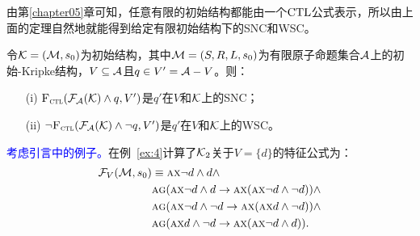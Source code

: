 由第\ref{chapter05}章可知，任意有限的初始结构都能由一个$\textrm{CTL}$公式表示，所以由上面的定理自然地就能得到给定有限初始结构下的SNC和WSC。
\begin{corollary}\label{thm:inK:SNC}
	令${\cal K}= ({\cal M}, s_0)$为初始结构，其中${\cal M}=(S,R,L,s_0)$为有限原子命题集合${\cal A}$上的初始-Kripke结构，$V \subseteq {\cal A}$且$q\in V' = {\cal A} - V$。则：
	\begin{itemize}
		\item[(i)] ${\textsc{F}_{\textsc{ctl}}}({\cal F}_{{\cal A}}({\cal K}) \wedge q, V')$是$q'$在$V$和${\cal K}$上的SNC；
		\item[(ii)] $\neg {\textsc{F}_{\textsc{ctl}}}({\cal F}_{{\cal A}}({\cal K}) \wedge \neg q, V')$是$q'$在$V$和${\cal K}$上的WSC。
	\end{itemize}
\end{corollary}

\begin{example}
	\textcolor{blue}{考虑引言中的例子。}在例~\ref{ex:4}计算了${\cal K}_2$关于$V=\{d\}$的特征公式为：
	\begin{align*}
		{\cal F}_V({\cal M}, s_0)&\equiv \textsc{a}\textsc{x} \neg d \wedge d \wedge \\
		& \textsc{a} \textsc{g}(\textsc{a}\textsc{x} \neg d \wedge d \rightarrow \textsc{a}\textsc{x}(\textsc{a}\textsc{x} \neg d \wedge \neg d))\wedge \\
		& \textsc{a} \textsc{g}(\textsc{a}\textsc{x} \neg d \wedge \neg d \rightarrow \textsc{a}\textsc{x}(\textsc{a}\textsc{x} d \wedge \neg d)) \wedge\\
		& \textsc{a} \textsc{g}(\textsc{a}\textsc{x} d \wedge \neg d \rightarrow \textsc{a}\textsc{x}(\textsc{a}\textsc{x} \neg d \wedge d)).
	\end{align*}
\end{example}


